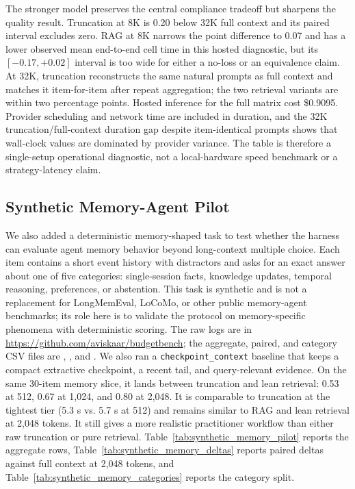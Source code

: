 \documentclass[11pt]{article}
\newcommand{\RepoURL}{\url{https://github.com/aviskaar/budgetbench}}
\begin{document}
The stronger model preserves the central compliance tradeoff but sharpens the
quality result.  Truncation at 8K is 0.20 below 32K full context and its paired
interval excludes zero.  RAG at 8K narrows the point difference to 0.07 and
has a lower observed mean end-to-end cell time in this hosted diagnostic, but its
$[-0.17,+0.02]$ interval is too wide for either a no-loss or an equivalence
claim.  At 32K, truncation reconstructs the same natural prompts as full
context and matches it item-for-item after repeat aggregation; the two
retrieval variants are within two percentage points.  Hosted inference for the
full matrix cost \$0.9095.  Provider scheduling and network time are included
in duration, and the 32K truncation/full-context duration gap despite
item-identical prompts shows that wall-clock values are dominated by provider
variance.  The table is therefore a single-setup operational diagnostic, not a
local-hardware speed benchmark or a strategy-latency claim.

\subsection{Synthetic Memory-Agent Pilot}

We also added a deterministic memory-shaped task to test whether the harness
can evaluate agent memory behavior beyond long-context multiple choice.  Each
item contains a short event history with distractors and asks for an exact
answer about one of five categories: single-session facts, knowledge updates,
temporal reasoning, preferences, or abstention.  This task is synthetic and is
not a replacement for LongMemEval, LoCoMo, or other public memory-agent
benchmarks; its role here is to validate the protocol on memory-specific
phenomena with deterministic scoring.  The raw logs are in
\RepoURL{}; the aggregate, paired, and category CSV files are
,
, and
.
We also ran a \texttt{checkpoint\_context} baseline that keeps a compact
extractive checkpoint, a recent tail, and query-relevant evidence.  On the
same 30-item memory slice, it lands between truncation and lean retrieval:
0.53 at 512, 0.67 at 1,024, and 0.80 at 2,048.  It is comparable to
truncation at the tightest tier (5.3 s vs. 5.7 s at 512) and remains similar
to RAG and lean retrieval at 2,048 tokens.  It still gives a more realistic
practitioner workflow than either raw truncation or pure retrieval.
Table~\ref{tab:synthetic_memory_pilot} reports the aggregate rows,
Table~\ref{tab:synthetic_memory_deltas} reports paired deltas against full
context at 2,048 tokens, and Table~\ref{tab:synthetic_memory_categories}
reports the category split.
\end{document}
